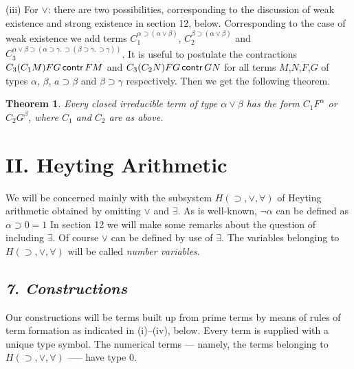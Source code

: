 \documentclass[12pt]{article}
\def\limp{\supset}
\def\a{\alpha}
\def\b{\beta}
\def\HIMP{H(\limp, \lor, \forall)}
\newtheorem{theorem}{Theorem}
\begin{document}
\medskip
\noindent
(iii) For $\lor$: there are two possibilities, corresponding to the discussion of weak existence and strong existence in section 12, below.
Corresponding to the case of weak existence we add terms $C_1^{\a \limp (\a \lor \b)}$, $C_2^{\b \limp (\a \lor \b)}$ and 
$C_3^{\a \lor \b \limp (\a \limp \gamma. \, \limp (\b \limp \gamma. \, \limp \gamma))}$. It is useful to postulate the contractions
$C_3(C_1M) FG \mathop{\sf contr} FM$ and $C_3(C_2N)FG \mathop{\sf contr} GN$
for all terms $M$,$N$,$F$,$G$ of types $\a$, $\b$, $a \limp \b$ and $\b \limp \gamma$ respectively. Then we get the following theorem.

\begin{theorem}
Every closed irreducible term of type $\a \lor \b$ has the form $C_1F^\a$ or $C_2 G^\b$, where $C_1$ and $C_2$ are as above.
\end{theorem}

\section*{II. Heyting Arithmetic}

We will be concerned mainly with the subsystem $H(\limp, \lor, \forall)$ of Heyting arithmetic obtained by omitting $\lor$ and $\exists$. As is well-known, $\lnot\a$ can be defined as $\a \limp 0 = 1$ In section 12 we will make some remarks about the question of including $\exists$. Of course $\lor$ can be defined by use of $\exists$. The variables belonging to $H(\limp, \lor, \forall)$ will be called {\it number variables}.

\subsection*{\it 7. Constructions}

Our constructions will be terms built up from prime terms by means of rules of term formation as indicated in (i)–(iv), below. Every term is supplied with a unique type symbol. The numerical terms — namely, the terms belonging to $\HIMP$ --— have type $0$.
\end{document}
